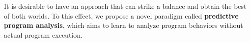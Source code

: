 It is desirable to have an approach that can strike a balance and
obtain the best of both worlds. To this effect, we propose a novel
paradigm called {\bf predictive program analysis}, which aims to learn
to analyze program behaviors without actual program execution.




